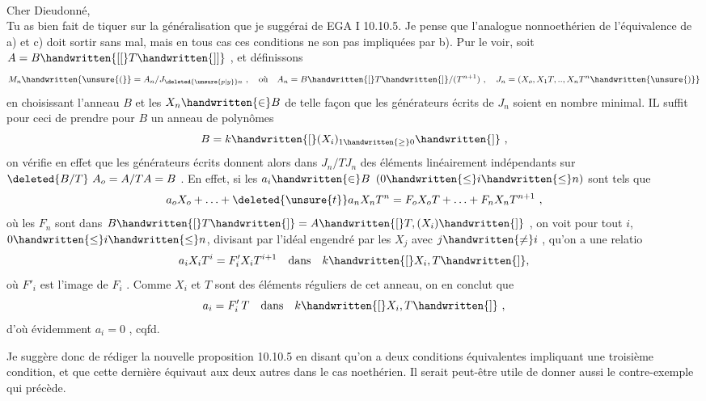 \noindent\hfill{}\\

\noindent Cher Dieudonné,\\

Tu as bien fait de tiquer sur la généralisation que je suggérai de EGA I 10.10.5. Je pense que l'analogue nonnoethérien de l'équivalence de a) et c) doit sortir sans mal, mais en tous cas ces conditions ne son pas impliquées par b). Pur le voir, soit $A=B\handwritten{[[}T\handwritten{]]}$ , et définissons
\[
M_n\handwritten{\unsure{(}}=A_n/J_{\deleted{\unsure{p|y}}n}\ ,\quad\text{où}\quad A_n=B\handwritten{[}T\handwritten{]}/(T^{n+1})\ ,\quad J_n=(X_o,X_1T,..,X_nT^n\handwritten{\unsure{)}}
\]
en choisissant l'anneau $B$ et les $X_n\handwritten{\in}B$ de telle façon que les générateurs écrits de $J_n$ soient en nombre minimal. IL suffit pour ceci de prendre pour $B$ un anneau de polynômes
\[
B=k\handwritten{[}(X_i)_{1\handwritten{\geq}0}\handwritten{]}\ ,
\]
on vérifie en effet que les générateurs écrits donnent alors dans $J_n/TJ_n$ des éléments linéairement indépendants sur $\deleted{B/T}\ A_o=A/TA=B$ . En effet, si les $a_i\handwritten{\in}B$ $(0\handwritten{\leq}i\handwritten{\leq}n)$ sont tels que
\[
a_oX_o+\ldots+\deleted{\unsure{t}}a_nX_nT^n=F_oX_oT+\ldots+F_nX_nT^{n+1}\ ,
\]
où les $F_n$ sont dans $B\handwritten{[}T\handwritten{]}=A\handwritten{[}T,(X_i)\handwritten{]}$ , on voit pour tout $i$, $0\handwritten{\leq}i\handwritten{\leq}n$, divisant par l'idéal engendré par les $X_j$ avec $j\handwritten{\ne}i$ , qu'on a une relatio
\[
a_iX_iT^i=F'_iX_iT^{i+1}\quad\text{dans}\quad k\handwritten{[}X_i,T\handwritten{]},
\]
où $F'_i$ est l'image de $F_i$ . Comme $X_i$ et $T$ sont des éléments réguliers de cet anneau, on en conclut que
\[
a_i=F'_i\,T\quad\text{dans}\quad k\handwritten{[}X_i,T\handwritten{]}\ ,
\]
d'où évidemment $a_i=0$ , cqfd.

Je suggère donc de rédiger la nouvelle proposition 10.10.5 en disant qu'on a deux conditions équivalentes  impliquant une troisième condition, et que cette dernière équivaut aux deux autres dans le cas noethérien. Il serait peut-être utile de donner aussi le contre-exemple qui précède.
